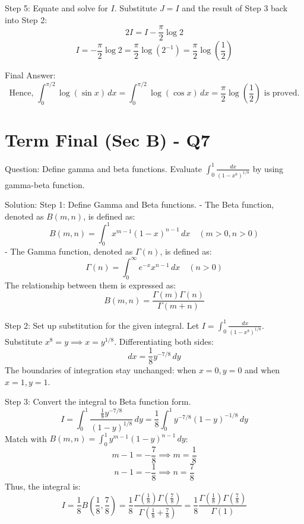\documentclass{article}
\begin{document}
Step 5: Equate and solve for $I$.
Substitute $J = I$ and the result of Step 3 back into Step 2:
\[
2I = I - \frac{\pi}{2} \log 2
\]
\[
I = -\frac{\pi}{2} \log 2 = \frac{\pi}{2} \log\left(2^{-1}\right) = \frac{\pi}{2} \log\left(\frac{1}{2}\right)
\]

Final Answer:
\[
\text{Hence, } \int_0^{\pi/2} \log(\sin x) \, dx = \int_0^{\pi/2} \log(\cos x) \, dx = \frac{\pi}{2} \log\left(\frac{1}{2}\right) \text{ is proved.}
\]

\section*{Term Final (Sec B) - Q7}
Question:
Define gamma and beta functions. Evaluate $\int_0^1 \frac{dx}{(1-x^8)^{1/8}}$ by using gamma-beta function.

Solution:
Step 1: Define Gamma and Beta functions.
- The Beta function, denoted as $B(m, n)$, is defined as:
  \[
  B(m, n) = \int_0^1 x^{m-1} (1-x)^{n-1} \, dx \quad (m > 0, n > 0)
  \]
- The Gamma function, denoted as $\Gamma(n)$, is defined as:
  \[
  \Gamma(n) = \int_0^\infty e^{-x} x^{n-1} \, dx \quad (n > 0)
  \]
The relationship between them is expressed as:
  \[
  B(m, n) = \frac{\Gamma(m) \Gamma(n)}{\Gamma(m+n)}
  \]

Step 2: Set up substitution for the given integral.
Let $I = \int_0^1 \frac{dx}{(1-x^8)^{1/8}}$.
Substitute $x^8 = y \implies x = y^{1/8}$.
Differentiating both sides:
\[
dx = \frac{1}{8} y^{-7/8} \, dy
\]
The boundaries of integration stay unchanged: when $x=0, y=0$ and when $x=1, y=1$.

Step 3: Convert the integral to Beta function form.
\[
I = \int_0^1 \frac{\frac{1}{8} y^{-7/8}}{(1-y)^{1/8}} \, dy = \frac{1}{8} \int_0^1 y^{-7/8} (1-y)^{-1/8} \, dy
\]
Match with $B(m, n) = \int_0^1 y^{m-1} (1-y)^{n-1} \, dy$:
\[
m - 1 = -\frac{7}{8} \implies m = \frac{1}{8}
\]
\[
n - 1 = -\frac{1}{8} \implies n = \frac{7}{8}
\]
Thus, the integral is:
\[
I = \frac{1}{8} B\left(\frac{1}{8}, \frac{7}{8}\right) = \frac{1}{8} \frac{\Gamma\left(\frac{1}{8}\right) \Gamma\left(\frac{7}{8}\right)}{\Gamma\left(\frac{1}{8} + \frac{7}{8}\right)} = \frac{1}{8} \frac{\Gamma\left(\frac{1}{8}\right) \Gamma\left(\frac{7}{8}\right)}{\Gamma(1)}
\]
\end{document}
